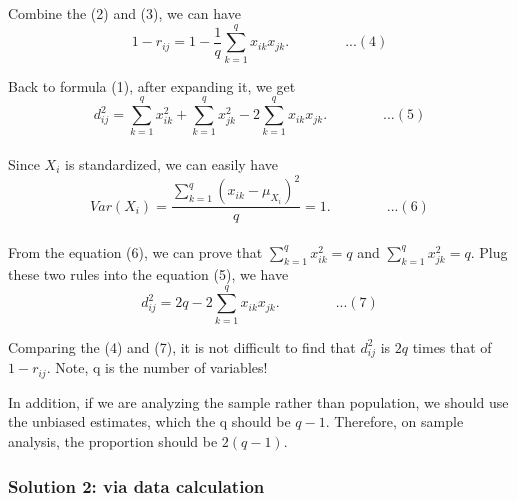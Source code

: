 \documentclass[
]{article}
\begin{document}
Combine the (2) and (3), we can have
\[1-r_{ij} = 1 - \frac{1}{q}\sum_{k=1}^{q}x_{ik}x_{jk}.\qquad\qquad ...(4)\]

Back to formula (1), after expanding it, we get
\[d_{ij}^2 =\sum_{k=1}^{q}x_{ik}^2+ \sum_{k=1}^{q}x_{jk}^2 - 2\sum_{k=1}^{q}x_{ik}x_{jk}.\qquad\qquad ...(5)\]\\
Since \(X_i\) is standardized, we can easily have
\[Var(X_i) = \frac{\sum_{k=1}^{q}(x_{ik}-\mu_{X_i})^2}{q}=1. \qquad\qquad ...(6)\]\\
From the equation (6), we can prove that \(\sum_{k=1}^{q}x_{ik}^2 = q\)
and \(\sum_{k=1}^{q}x_{jk}^2 = q\). Plug these two rules into the
equation (5), we have
\[d_{ij}^2 =2q - 2\sum_{k=1}^{q}x_{ik}x_{jk}.\qquad\qquad ...(7)\]

Comparing the (4) and (7), it is not difficult to find that \(d_{ij}^2\)
is \(2q\) times that of \(1-r_{ij}.\) Note, q is the number of
variables!

In addition, if we are analyzing the sample rather than population, we
should use the unbiased estimates, which the q should be \(q-1\).
Therefore, on sample analysis, the proportion should be \(2(q-1).\)

\hypertarget{solution-2-via-data-calculation}{%
\subsubsection{Solution 2: via data
calculation}\label{solution-2-via-data-calculation}}
\end{document}
